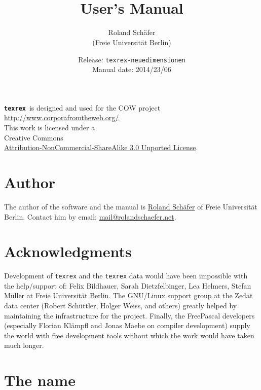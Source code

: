 \documentclass[12pt,a4paper]{article}
\author{Roland Schäfer\\[1ex](Freie Universität Berlin)}
\title{\Huge\textbf{\trthis}\\\Large\vspace{1cm}User's Manual}
\date{Release: \texttt{texrex-neuedimensionen}\\[1ex]Manual date: 2014/23/06}
\newcommand{\trthis}{\texttt{texrex}}
\begin{document}
\maketitle

\thispagestyle{empty}
\vspace{8cm}
\begin{center}
  \footnotesize
  \textbf{\trthis}\ is designed and used for the COW project\\
  \url{http://www.corporafromtheweb.org/}\\
  \vspace{1cm}
  This work is licensed under a\\
  Creative Commons\\
  \href{http://creativecommons.org/licenses/by-nc-sa/3.0/}{Attribution-NonCommercial-ShareAlike 3.0 Unported License}.\\
\end{center}

\pagebreak
\clearpage{}

\tableofcontents
\pagebreak

\section*{Author}

The author of the software and the manual is \href{http://www.rolandschaefer.net/}{Roland Schäfer} of Freie Universität Berlin.
Contact him by email: \url{mail@rolandschaefer.net}.

\section*{Acknowledgments}

Development of \texttt{texrex} and the \texttt{texrex} data would have been impossible with the help\slash support of: Felix Bildhauer, Sarah Dietzfelbinger, Lea Helmers, Stefan Müller at Freie Universität Berlin.
The GNU\slash Linux support group at the Zedat data center (Robert Schüttler, Holger Weiss, and others) greatly helped by maintaining the infrastructure for the project.
Finally, the FreePascal developers (especially Florian Klämpfl and Jonas Maebe on compiler development) supply the world with free development tools without which the work would have taken much longer.

\section*{The name}
\end{document}
